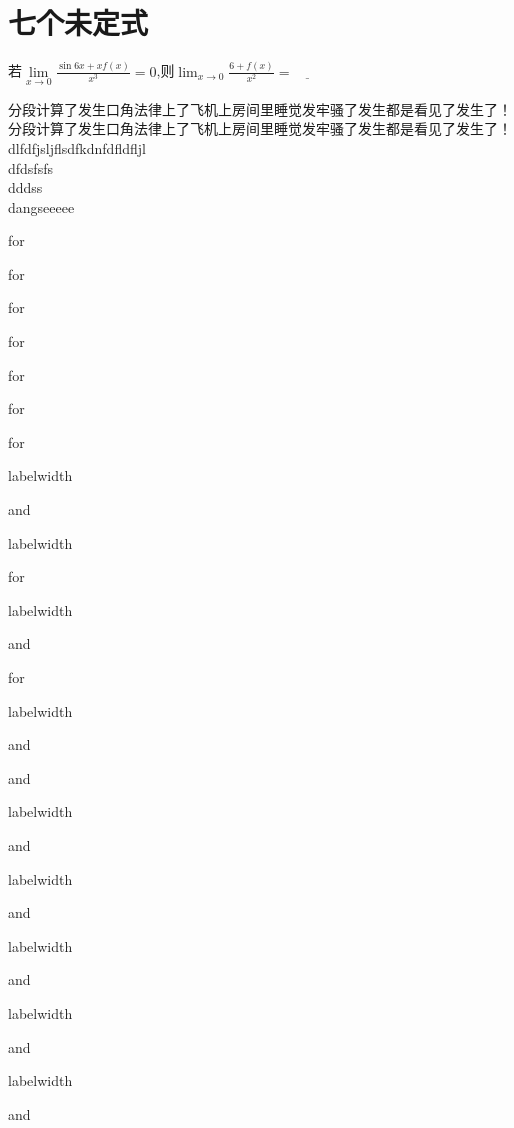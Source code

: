 \section{七个未定式}

\begin{multicols}{2}
\begin{examples}
		若$\lim\limits_{x\to0}{\frac{\sin{6x}+xf(x)}{x^3}}=0$,则$\lim_{x\to0}{\frac{6+f(x)}{x^2}}=\underline{\qquad}$
\end{examples}

			分段计算了发生口角法律上了飞机上房间里睡觉发牢骚了发生都是看见了发生了！
			分段计算了发生口角法律上了飞机上房间里睡觉发牢骚了发生都是看见了发生了！\\
	dlfdfjsljflsdfkdnfdfldfljl \\
	dfdsfsfs \\
	dddss\\
	dangseeeee
\end{multicols}

\begin{multicols}{2}
	\begin{homeworks}
		\item for
		\item for
		\item for
		\item for
		\item for
		\item for
		\item for
		\item labelwidth
		\item and
		\item labelwidth
		\item for
		\item labelwidth
		\item and
		\item for
		\item labelwidth
		\item and
		\item and
		\item labelwidth
		\item and
		\item labelwidth
		\item and
		\item labelwidth
		\item and
		\item labelwidth
		\item and
		\item labelwidth
		\item and
	\end{homeworks}
\end{multicols}
